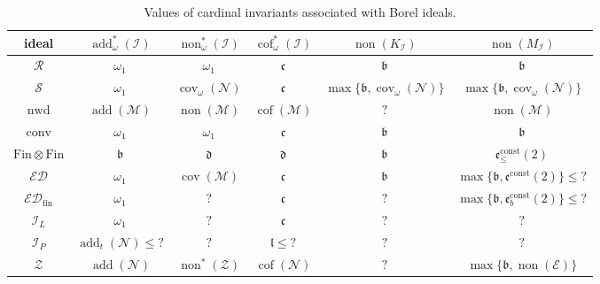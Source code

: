 \documentclass[a4paper,12pt]{amsart}
\theoremstyle{definition}
\numberwithin{thm}{section}
\numberwithin{equation}{section}
\newcommand{\bb}{\mathfrak{b}}
\newcommand{\cc}{\mathfrak{c}}
\newcommand{\dd}{\mathfrak{d}}
\newcommand{\ee}{\mathfrak{e}}
\newcommand{\n}{\mathcal{N}}
\DeclareMathOperator{\non}{non}
\DeclareMathOperator{\cov}{cov}
\DeclareMathOperator{\add}{add}
\DeclareMathOperator{\cof}{cof}
\newcommand{\covm}{\cov(\mathcal{M})}
\newcommand{\nonm}{\non(\mathcal{M})}
\newcommand{\addm}{\add(\mathcal{M})}
\newcommand{\cofm}{\cof(\mathcal{M})}
\newcommand{\addn}{\add(\mathcal{N})}
\newcommand{\cofn}{\cof(\mathcal{N})}
\newcommand{\ed}{\mathcal{ED}}
\newcommand{\none}{\non(\mathcal{E})}
\newcommand{\I}{\mathscr{I}}
\newcommand{\edfin}{\mathcal{ED}_\mathrm{fin}}
\newcommand{\finfin}{\mathrm{Fin}\otimes\mathrm{Fin}}
\newcommand{\ki}{K_\I}
\newcommand{\mzb}{M}
\newcommand{\mzbi}{\mzb_{\I}}
\newcommand{\Z}{\mathcal{Z}}
\newcommand{\nwd}{\mathrm{nwd}}
\newcommand{\conv}{\mathrm{conv}}
\newcommand{\covomn}{\operatorname{cov}_\omega(\mathcal{N})}
\begin{document}
    \begin{table}[t]
		\centering
		\begin{tabular}{c|ccccc}
			\hline
			ideal &  $\add^*_\omega(\I)$  & $\non^*_\omega(\I)$  & $\cof^*_\omega(\I)$ & $\non(\ki)$ & $\non(\mzbi)$\\
			
			\hline
			
			$\mathcal{R}$   & $\omega_1$  & $\omega_1$ &   $\cc$ & $\bb$ & $\bb$\\
			$\mathcal{S}$   & $\omega_1$  & $\covomn$ &   $\cc$ & $\max\{\bb,\covomn\}$ & $\max\{\bb,\covomn\}$\\
			$\nwd$   & $\addm$  & $\nonm$ &   $\cofm$ & $?$ & $\nonm$\\
			$\conv$   & $\omega_1$  & $\omega_1$ &    $\cc$ & $\bb$ & $\bb$\\
			$\finfin$   & $\bb$  & $\dd$ &   $\dd$ & $\bb$ & $\ee^{\mathrm{const}}_\leq(2)$\\
			$\ed$   & $\omega_1$  & $\covm$  & $\cc$ & $\bb$ & $\max\{\bb, \ee^{\mathrm{const}}(2)\} \leq \mathord{?}$\\
			$\edfin$   & $\omega_1$  & $?$  & $\cc$ & $?$ & $\max\{\bb, \ee^{\mathrm{const}}_b(2)\}\leq\mathord{?}$\\
            $\I_L$ & $\omega_1$ & $?$ & $\cc$ & $?$ & $?$\\
            $\I_P$ & $ \add_t(\n)\leq\mathord{?}$ & $?$ & $\mathfrak{l}\leq \mathord{?}$ & $?$ & $?$ \\
			$\Z$   & $\addn$  & $\non^*(\Z)$ &   $\cofn$ & $?$ & $\max\{\bb,\none\}$\\
			\hline 
		\end{tabular}
        \caption{Values of cardinal invariants associated with Borel ideals.}\label{table_values} 
	\end{table}
\end{document}
